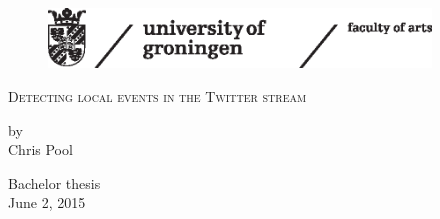 
\begin{titlepage}

\begin{figure}[h!] %

 \includegraphics[width=4in]{Figures/ruglogo.eps} 
\end{figure}
\begin{center}

\vspace{30 mm}
\begingroup \linespread{1,75} \selectfont 
\textsc{\LARGE Detecting local events in the Twitter stream}\\[1,5cm]
\endgroup


by\\[0,5cm]
Chris Pool\\[2,5cm]


\end{center}
\vfill
Bachelor thesis\\
June 2, 2015



\end{titlepage}
